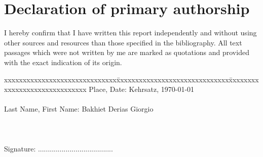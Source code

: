 \section*{Declaration of primary authorship}
\label{chap:declaration_authorship}

\vspace*{10mm} 

I hereby confirm that I have written this report independently and without using other sources and resources than those specified in the bibliography. All text passages which were not written by me are marked as quotations and provided with the exact indication of its origin. 

\vspace{15mm}

\begin{tabbing}
xxxxxxxxxxxxxxxxxxxxxxxxxxxxxx\=xxxxxxxxxxxxxxxxxxxxxxxxxxxxxx\=xxxxxxxxxxxxxxxxxxxxxxxxxxxxxx\kill
Place, Date:		\> Kehrsatz, \today \\ \\  %
Last Name, First Name:	\> Bakhiet Derias Giorgio\\ \\ \\ \\ 
Signature:	\> ......................................\> 
\end{tabbing}
